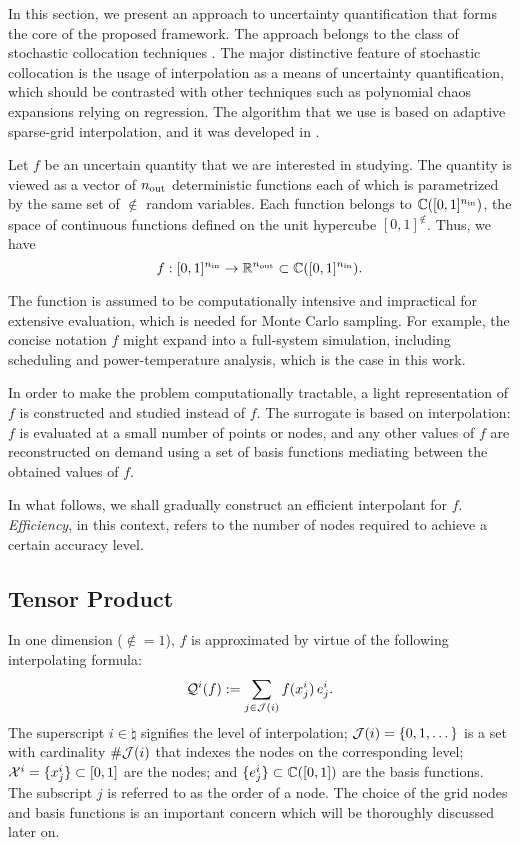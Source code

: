 In this section, we present an approach to uncertainty quantification that forms
the core of the proposed framework. The approach belongs to the class of
stochastic collocation techniques \cite{xiu2010}. The major distinctive feature
of stochastic collocation is the usage of interpolation as a means of
uncertainty quantification, which should be contrasted with other techniques
such as polynomial chaos expansions relying on regression. The algorithm that we
use is based on adaptive sparse-grid interpolation, and it was developed in
\cite{ma2009}.

Let $f$ be an uncertain quantity that we are interested in studying. The
quantity is viewed as a vector of ${n_\text{out}}$ deterministic functions each of which
is parametrized by the same set of $\nin$ random variables. Each function
belongs to $\mathbb{C}([0, 1]^{n_\text{in}})$, the space of continuous functions defined
on the unit hypercube $[0, 1]^\nin$. Thus, we have
\[
  f: [0, 1]^{n_\text{in}} \to \mathbb{R}^{n_\text{out}} \subset \mathbb{C}([0, 1]^{n_\text{in}}).
\]

The function is assumed to be computationally intensive and impractical for
extensive evaluation, which is needed for Monte Carlo sampling. For example, the
concise notation $f$ might expand into a full-system simulation, including
scheduling and power-temperature analysis, which is the case in this work.

In order to make the problem computationally tractable, a light representation
of $f$ is constructed and studied instead of $f$. The surrogate is based on
interpolation: $f$ is evaluated at a small number of points or nodes, and any
other values of $f$ are reconstructed on demand using a set of basis functions
mediating between the obtained values of $f$.

In what follows, we shall gradually construct an efficient interpolant for $f$.
\emph{Efficiency}, in this context, refers to the number of nodes required to
achieve a certain accuracy level.

\subsection{Tensor Product}
In one dimension ($\nin = 1$), $f$ is approximated by virtue of the following
interpolating formula:
\[
  \mathcal{Q}^{i}(f) := \sum_{j \in \mathcal{J}(i)} f(x^i_j) \, e^i_j.
\]
The superscript $i \in \natural$ signifies the level of interpolation;
$\mathcal{J}(i) = \{ 0, 1, \dots \}$ is a set with cardinality
$\# \mathcal{J}(i)$ that indexes the nodes on the corresponding level;
$\mathcal{X}^i = \{ x^i_j \} \subset [0, 1]$ are the nodes; and $\{ e^i_j \} \subset
\mathbb{C}([0, 1])$ are the basis functions. The subscript $j$ is referred to
as the order of a node. The choice of the grid nodes and basis functions is an
important concern which will be thoroughly discussed later on.

